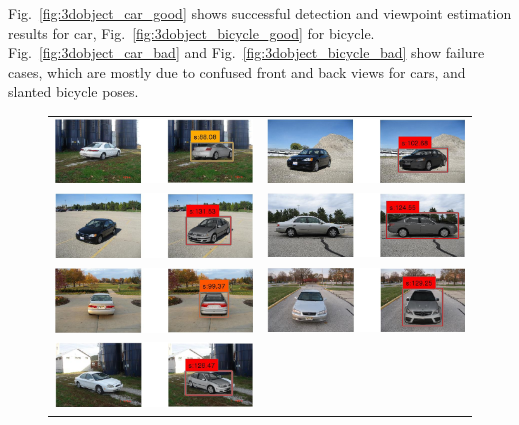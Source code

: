 \documentclass[10pt,twocolumn,letterpaper]{article}
\begin{document}
Fig.~\ref{fig:3dobject_car_good} shows successful detection and
viewpoint estimation results for car,
Fig.~\ref{fig:3dobject_bicycle_good} for
bicycle. Fig.~\ref{fig:3dobject_car_bad} and
Fig.~\ref{fig:3dobject_bicycle_bad} show failure cases, which are
mostly due to confused front and back views for cars, and slanted
bicycle poses.


\begin{figure}[h]
\setlength\tabcolsep{1pt}
\centering
\begin{tabular}{|c|c|}
  \hline
  \includegraphics[width=0.40\linewidth]{supp/car32.png} &
  \includegraphics[width=0.40\linewidth]{supp/car26.png} \\
  \includegraphics[width=0.40\linewidth]{supp/car29.png} & 
  \includegraphics[width=0.40\linewidth]{supp/car10.png} \\
  \includegraphics[width=0.40\linewidth]{supp/car1.png} &
  \includegraphics[width=0.40\linewidth]{supp/car8.png} \\
  \includegraphics[width=0.40\linewidth]{supp/car20.png} & 

\end{tabular}
\end{figure}
\end{document}
